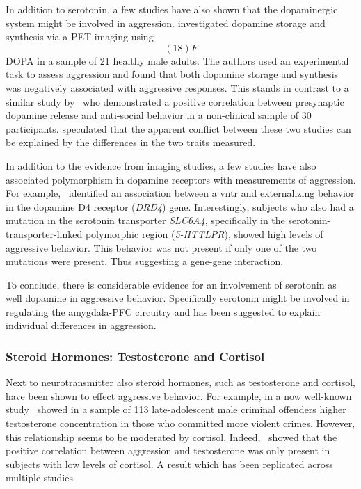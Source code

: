 In addition to serotonin, a few studies have also shown that the dopaminergic system might be involved in aggression.
\citet{Schluter2013} investigated dopamine storage and synthesis via a PET imaging using \[(18)F\]DOPA in a sample of 21 healthy male adults.
The authors used an experimental task to assess aggression and found that both dopamine storage and synthesis was negatively associated with aggressive responses.
This stands in contrast to a similar study by~\citet{Buckholtz2010} who demonstrated a positive correlation between presynaptic dopamine release and anti-social behavior in a non-clinical sample of 30 participants. 
\citet{Rosell2015} speculated that the apparent conflict between these two studies can be explained by the differences in the two traits measured.

In addition to the evidence from imaging studies, a few studies have also associated polymorphism in dopamine receptors with measurements of aggression.
For example,~\citet{Hohmann2009} identified an association between a \acrfull{vntr} and externalizing behavior in the dopamine D4 receptor (\textit{DRD4}) gene.
Interestingly, subjects who also had a mutation in the serotonin transporter \textit{SLC6A4}, specifically in the serotonin-transporter-linked polymorphic region (\textit{5-HTTLPR}), showed high levels of aggressive behavior.
This behavior was not present if only one of the two mutations were present.
Thus suggesting a gene-gene interaction.

To conclude, there is considerable evidence for an involvement of serotonin as well dopamine in aggressive behavior.
Specifically serotonin might be involved in regulating the amygdala-PFC circuitry and has been suggested to explain individual differences in aggression.

\subsubsection{Steroid Hormones: Testosterone and Cortisol}
\label{ssub:steriod_hormones_testosteron_and_cortisol}

Next to neurotransmitter also steroid hormones, such as testosterone and cortisol, have been shown to effect aggressive behavior.
For example, in a now well-known study~\citet{Dabbes1991} showed in a sample of 113 late-adolescent male criminal offenders higher testosterone concentration in those who committed more violent crimes.
However, this relationship seems to be moderated by cortisol.
Indeed,~\citet{Dabbes1991} showed that the positive correlation between aggression and testosterone was only present in subjects with low levels of cortisol.
A result which has been replicated across multiple studies~\cite{Popma2007,Rosell2015,Kuepper2010}


